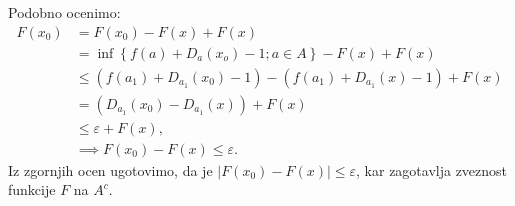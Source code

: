 \documentclass[mat1]{fmfdelo}
\newcommand{\0}{0}
\begin{document}
\begin{dokaz}
Podobno ocenimo:
\begin{equation*}
\begin{split}
F(x_0) & = F(x_0) - F(x) + F(x)\\
& =\inf \left \{ f(a) + D_a(x_o) - 1; a \in A \right \} - F(x) + F(x)\\
& \leq (f(a_1) + D_{a_1}(x_0) - 1) -  (f(a_1) + D_{a_1}(x) - 1) + F(x)\\
& = (D_{a_1}(x_0) -  D_{a_1}(x)) + F(x) \\
& \leq \varepsilon + F(x), \\
& \implies F(x_0) - F(x) \leq \varepsilon.
\end{split}
\end{equation*}
Iz zgornjih ocen ugotovimo, da je $|F(x_0) - F(x)| \leq \varepsilon$, kar zagotavlja zveznost funkcije $F$ na $A^c$.


\end{dokaz}
\end{document}
